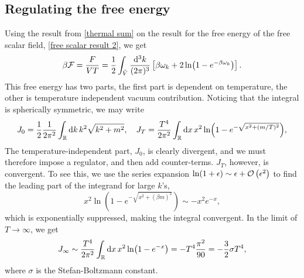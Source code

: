 \subsection{Regulating the free energy}
\label{section: regualting free energy}
Using the result from \autoref{thermal sum} on the result for the free energy of the free scalar field, \autoref{free scalar result 2}, we get
\begin{equation}
    \label{free scalar free enrgy}
    \beta \mathcal{F} = \frac{F}{VT}
    = \frac{1}{2} \int_{\tilde V} \frac{\dd^3 k}{(2 \pi)^3}
    \left[
        \beta \omega_k + 2\ln(1 - e^{-\beta\omega_k})
    \right].
\end{equation}
This free energy has two parts, the first part is dependent on temperature, the other is temperature independent vacuum contribution.
Noticing that the integral is spherically symmetric, we may write
\begin{equation}
    J_0 = \frac{1}{2} \frac{1}{2 \pi^2}\int_{\mathbb{R}} \dd k \, k^2 \sqrt{k^2 + m^2}, \quad
    J_T = \frac{T^4}{2 \pi^2}\int_{\mathbb{R}} \dd x \, x^2  \ln(1 - e^{-\sqrt{x^2 + (m/T)^2}}), 
\end{equation}
The temperature-independent part, $J_0$, is clearly divergent, and we must therefore impose a regulator, and then add counter-terms.
$J_T$, however, is convergent. 
To see this, we use the series expansion $\ln(1 + \epsilon) \sim \epsilon + \mathcal{O}\left(\epsilon^{2}\right)$ to find the leading part of the integrand for large $k$'s, 
\begin{equation}
    x^2 \ln(1 - e^{-\sqrt{x^2 + (\beta m)^2}}) \sim - x^2 e^{-x}, 
\end{equation}
which is exponentially suppressed, making the integral convergent.
In the limit of $T \rightarrow \infty$, we get
\begin{equation}
    J_\infty \sim \frac{T^4}{2 \pi^2} \int_{\mathbb{R}} \dd x \, x^2 \ln(1 - e^{-x})
    = - T^4 \frac{\pi^2}{90} = -\frac{3}{2} \sigma T^4,
\end{equation}
where $\sigma$ is the Stefan-Boltzmann constant. 

